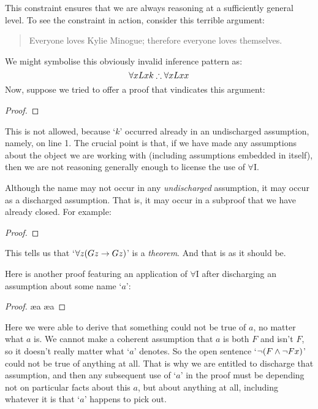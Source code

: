  This constraint ensures that we are always reasoning at a sufficiently general level. To see the constraint in action, consider this terrible argument:
	\begin{quote}
		Everyone loves Kylie Minogue; therefore everyone loves themselves.
	\end{quote}
We might symbolise this obviously invalid inference pattern as:
$$\forall x Lxk \mathrel{\therefore} \forall x Lxx$$
Now, suppose we tried to offer a proof that vindicates this argument:
\begin{proof}
	 
	 
\end{proof}\noindent
This is not allowed, because `$k$' occurred already in an undischarged assumption, namely, on line 1. The crucial point is that, if we have made any assumptions about the object we are working with (including assumptions embedded in  itself), then we are not reasoning generally enough to license  the use of $\forall$I.

Although the name may not occur in any \emph{undischarged} assumption, it may occur as a discharged assumption. That is, it may occur in a subproof that we have already closed. For example:
\begin{proof}
	\open
	\close
\end{proof}
This tells us that `$\forall z (Gz \rightarrow Gz)$' is a \emph{theorem}. And that is as it should be. 

Here is another proof featuring an application of $\forall$I after discharging an assumption about some name `$a$':
\begin{proof}
	\open
	\ae{a}
	\ae{a}
	\close
\end{proof} Here we were able to derive that something could not be true of $a$, no matter what $a$ is. We cannot make a coherent assumption that $a$ is both $F$ and isn't $F$, so it doesn't really matter what `$a$' denotes. So the open sentence `$\neg(F \wedge \neg Fx)$' could not be true of anything at all. That is why we are entitled to discharge that assumption, and then any subsequent use of `$a$' in the proof must be depending not on particular facts about this $a$, but about anything at all, including whatever it is that `$a$' happens to pick out. 

